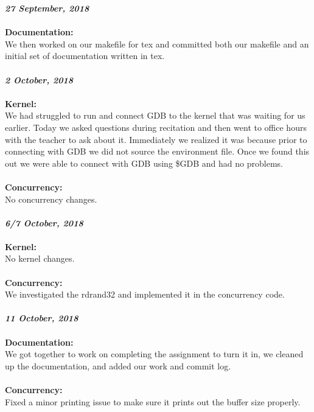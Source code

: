 \documentclass[10pt,a4paper,english]{article}
\begin{document}
\noindent
\textit{\textbf{27 September, 2018}} \\\\
\textbf{Documentation:} \\
\indent We then worked on our makefile for tex and committed both our makefile and an initial set of documentation written in tex.
\\\\

\noindent
\textit{\textbf{2 October, 2018}} \\\\
\textbf{Kernel:} \\
\indent We had struggled to run and connect GDB to the kernel that was waiting for us earlier. Today we asked questions during recitation and then went to office hours with the teacher to ask about it. Immediately we realized it was because prior to connecting with GDB we did not source the environment file. Once we found this out we were able to connect with GDB using \$GDB and had no problems.
\\\\
\textbf{Concurrency:} \\
\indent No concurrency changes.
\\\\

\noindent
\textit{\textbf{6/7 October, 2018}} \\\\
\textbf{Kernel:} \\
\indent No kernel changes.
\\\\
\textbf{Concurrency:} \\
\indent We investigated the rdrand32 and implemented it in the concurrency code.
\\\\

\noindent
\textit{\textbf{11 October, 2018}} \\\\
\textbf{Documentation:} \\
\indent We got together to work on completing the assignment to turn it in, we cleaned up the documentation, and added our work and commit log.
\\\\
\textbf{Concurrency:} \\
\indent Fixed a minor printing issue to make sure it prints out the buffer size properly.
\\\\

\end{document}
